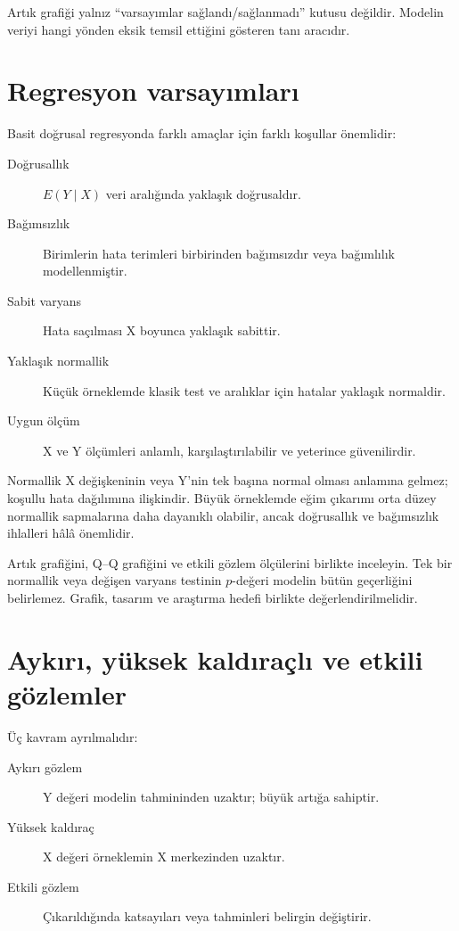 Artık grafiği yalnız ``varsayımlar sağlandı/sağlanmadı'' kutusu değildir.
Modelin veriyi hangi yönden eksik temsil ettiğini gösteren tanı aracıdır.

\section{Regresyon varsayımları}

Basit doğrusal regresyonda farklı amaçlar için farklı koşullar önemlidir:

\begin{description}
  \item[Doğrusallık] $E(Y\mid X)$ veri aralığında yaklaşık doğrusaldır.
  \item[Bağımsızlık] Birimlerin hata terimleri birbirinden bağımsızdır veya bağımlılık modellenmiştir.
  \item[Sabit varyans] Hata saçılması X boyunca yaklaşık sabittir.
  \item[Yaklaşık normallik] Küçük örneklemde klasik test ve aralıklar için hatalar yaklaşık normaldir.
  \item[Uygun ölçüm] X ve Y ölçümleri anlamlı, karşılaştırılabilir ve yeterince güvenilirdir.
\end{description}

Normallik X değişkeninin veya Y'nin tek başına normal olması anlamına gelmez;
koşullu hata dağılımına ilişkindir. Büyük örneklemde eğim çıkarımı orta düzey
normallik sapmalarına daha dayanıklı olabilir, ancak doğrusallık ve bağımsızlık
ihlalleri hâlâ önemlidir.

\begin{assumptionbox}
Artık grafiğini, Q--Q grafiğini ve etkili gözlem ölçülerini birlikte inceleyin.
Tek bir normallik veya değişen varyans testinin $p$-değeri modelin bütün
geçerliğini belirlemez. Grafik, tasarım ve araştırma hedefi birlikte
değerlendirilmelidir.
\end{assumptionbox}

\section{Aykırı, yüksek kaldıraçlı ve etkili gözlemler}

Üç kavram ayrılmalıdır:

\begin{description}
  \item[Aykırı gözlem] Y değeri modelin tahmininden uzaktır; büyük artığa sahiptir.
  \item[Yüksek kaldıraç] X değeri örneklemin X merkezinden uzaktır.
  \item[Etkili gözlem] Çıkarıldığında katsayıları veya tahminleri belirgin değiştirir.
\end{description}

